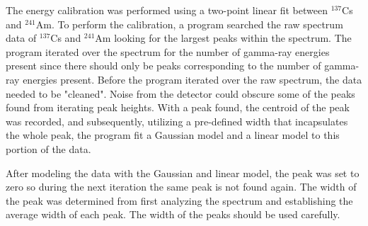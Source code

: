 The energy calibration was performed using a two-point linear fit between
$^{137}$Cs and $^{241}$Am. To perform the calibration, a program searched
the raw spectrum data of $^{137}$Cs and $^{241}$Am looking for
the largest peaks within the spectrum. The program iterated over the spectrum for the
number of gamma-ray energies present since there should only be peaks corresponding
to the number of gamma-ray energies present. Before the program iterated over the raw spectrum,
the data needed to be "cleaned". Noise from the detector could obscure some of the peaks
found from iterating peak heights. With a peak found, the centroid of the peak was
recorded, and subsequently, utilizing a pre-defined width that incapsulates
the whole peak, the program fit a Gaussian model and a linear model to this portion of the data.

After modeling the data with the Gaussian and linear model, the peak was
set to zero so during the next iteration the same peak is not found again.
The width of the peak was determined from first analyzing the spectrum and establishing
the average width of each peak. The width of the peaks should be used carefully.
